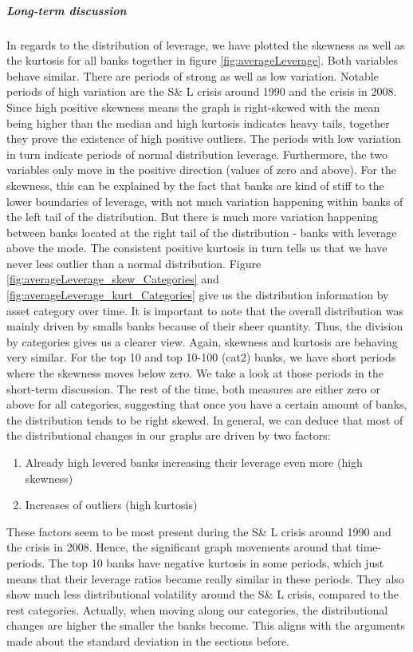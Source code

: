 \documentclass[12pt, a4paper]{article} %
\begin{document}
\subparagraph{Long-term discussion}

In regards to the distribution of leverage, we have plotted the skewness as well as the kurtosis for all banks together in figure \ref{fig:averageLeverage}. Both variables behave similar. There are periods of strong as well as low variation. Notable periods of high variation are the S\& L crisis around 1990 and the crisis in 2008. Since high positive skewness means the graph is right-skewed with the mean being higher than the median and high kurtosis indicates heavy tails, together they prove the existence of high positive outliers. The periods with low variation in turn indicate periods of normal distribution leverage. Furthermore, the two variables only move in the positive direction (values of zero and above). For the skewness, this can be explained by the fact that banks are kind of stiff to the lower boundaries of leverage, with not much variation happening within banks of the left tail of the distribution. But there is much more variation happening between banks located at the right tail of the distribution - banks with leverage above the mode. The consistent positive kurtosis in turn tells us that we have never less outlier than a normal distribution. 
Figure \ref{fig:averageLeverage_skew_Categories} and \ref{fig:averageLeverage_kurt_Categories} give us the distribution information by asset category over time. It is important to note that the overall distribution was mainly driven by smalls banks because of their sheer quantity. Thus, the division by categories gives us a clearer view. Again, skewness and kurtosis are behaving very similar. For the top 10 and top 10-100 (cat2) banks, we have short periods where the skewness moves below zero. We take a look at those periods in the short-term discussion. The rest of the time, both measures are either zero or above for all categories, suggesting that once you have a certain amount of banks, the distribution tends to be right skewed. 
In general, we can deduce that most of the distributional changes in our graphs are driven by two factors:
\begin{enumerate}
\item Already high levered banks increasing their leverage even more (high skewness)
\item Increases of outliers (high kurtosis)
\end{enumerate}
These factors seem to be most present during the S\& L crisis around 1990 and the crisis in 2008. Hence, the significant graph movements around that time-periods.
The top 10 banks have negative kurtosis in some periods, which just means that their leverage ratios became really similar in these periods. They also show much less distributional volatility around the S\& L crisis, compared to the rest categories.   Actually, when moving along our categories, the distributional changes are higher the smaller the banks become. This aligns with the arguments made about the standard deviation in the sections before. 
\end{document}

